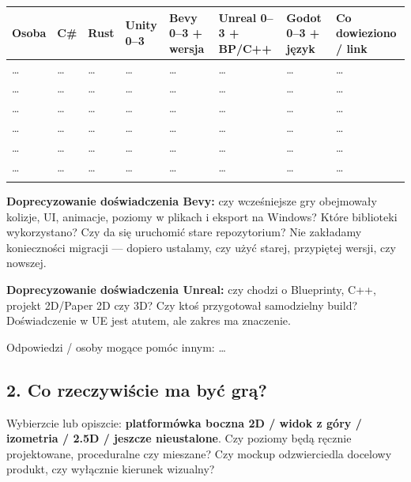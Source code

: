 \documentclass[10pt,a4paper]{article}
\begin{document}
{\scriptsize\setlength{\tabcolsep}{2mm}\begin{longtable}{>{\raggedright\arraybackslash}p{11.36mm}>{\raggedright\arraybackslash}p{7.81mm}>{\raggedright\arraybackslash}p{7.81mm}>{\raggedright\arraybackslash}p{17.04mm}>{\raggedright\arraybackslash}p{26.98mm}>{\raggedright\arraybackslash}p{26.98mm}>{\raggedright\arraybackslash}p{21.30mm}>{\raggedright\arraybackslash}p{22.72mm}}
\toprule \textbf{Osoba} & \textbf{C\#} & \textbf{Rust} & \textbf{Unity 0–3} & \textbf{Bevy 0–3 + wersja} & \textbf{Unreal 0–3 + BP/C++} & \textbf{Godot 0–3 + język} & \textbf{Co dowieziono / link} \\ \midrule\endhead
… & … & … & … & … & … & … & … \\ \addlinespace[2pt]
… & … & … & … & … & … & … & … \\ \addlinespace[2pt]
… & … & … & … & … & … & … & … \\ \addlinespace[2pt]
… & … & … & … & … & … & … & … \\ \addlinespace[2pt]
… & … & … & … & … & … & … & … \\ \addlinespace[2pt]
… & … & … & … & … & … & … & … \\ \addlinespace[2pt]
\bottomrule\end{longtable}}


\textbf{Doprecyzowanie doświadczenia Bevy:} czy wcześniejsze gry obejmowały kolizje, UI, animacje, poziomy w plikach i eksport na Windows? Które biblioteki wykorzystano? Czy da się uruchomić stare repozytorium? Nie zakładamy konieczności migracji — dopiero ustalamy, czy użyć starej, przypiętej wersji, czy nowszej.



\textbf{Doprecyzowanie doświadczenia Unreal:} czy chodzi o Blueprinty, C++, projekt 2D/Paper 2D czy 3D? Czy ktoś przygotował samodzielny build? Doświadczenie w UE jest atutem, ale zakres ma znaczenie.



Odpowiedzi / osoby mogące pomóc innym: …



\subsection*{2. Co rzeczywiście ma być grą?}


Wybierzcie lub opiszcie: \textbf{platformówka boczna 2D / widok z góry / izometria / 2.5D / jeszcze nieustalone}. Czy poziomy będą ręcznie projektowane, proceduralne czy mieszane? Czy mockup odzwierciedla docelowy produkt, czy wyłącznie kierunek wizualny?
\end{document}
